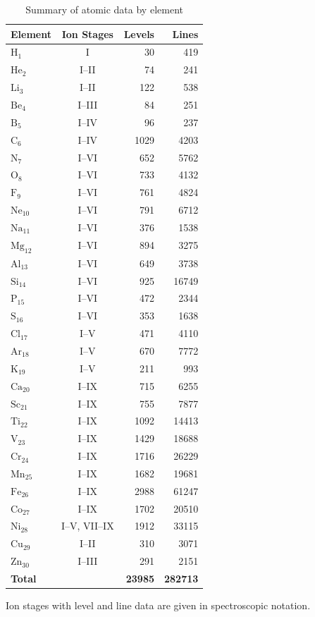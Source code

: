 \documentclass{article}
\begin{document}
\begin{table}[p]
\centering
\caption{Summary of atomic data by element\label{tab:atomdata-summary}}
\small
\renewcommand{\arraystretch}{1.12}
\begin{tabular*}{0.9\textwidth}{@{\extracolsep{\fill}}lcrr}
\hline
\textbf{Element} & \textbf{Ion Stages} & \textbf{Levels} & \textbf{Lines} \\
\hline
$\mathrm{H}_{1}$ & I & 30 & 419 \\
$\mathrm{He}_{2}$ & I--II & 74 & 241 \\
$\mathrm{Li}_{3}$ & I--II & 122 & 538 \\
$\mathrm{Be}_{4}$ & I--III & 84 & 251 \\
$\mathrm{B}_{5}$ & I--IV & 96 & 237 \\
$\mathrm{C}_{6}$ & I--IV & 1029 & 4203 \\
$\mathrm{N}_{7}$ & I--VI & 652 & 5762 \\
$\mathrm{O}_{8}$ & I--VI & 733 & 4132 \\
$\mathrm{F}_{9}$ & I--VI & 761 & 4824 \\
$\mathrm{Ne}_{10}$ & I--VI & 791 & 6712 \\
$\mathrm{Na}_{11}$ & I--VI & 376 & 1538 \\
$\mathrm{Mg}_{12}$ & I--VI & 894 & 3275 \\
$\mathrm{Al}_{13}$ & I--VI & 649 & 3738 \\
$\mathrm{Si}_{14}$ & I--VI & 925 & 16749 \\
$\mathrm{P}_{15}$ & I--VI & 472 & 2344 \\
$\mathrm{S}_{16}$ & I--VI & 353 & 1638 \\
$\mathrm{Cl}_{17}$ & I--V & 471 & 4110 \\
$\mathrm{Ar}_{18}$ & I--V & 670 & 7772 \\
$\mathrm{K}_{19}$ & I--V & 211 & 993 \\
$\mathrm{Ca}_{20}$ & I--IX & 715 & 6255 \\
$\mathrm{Sc}_{21}$ & I--IX & 755 & 7877 \\
$\mathrm{Ti}_{22}$ & I--IX & 1092 & 14413 \\
$\mathrm{V}_{23}$ & I--IX & 1429 & 18688 \\
$\mathrm{Cr}_{24}$ & I--IX & 1716 & 26229 \\
$\mathrm{Mn}_{25}$ & I--IX & 1682 & 19681 \\
$\mathrm{Fe}_{26}$ & I--IX & 2988 & 61247 \\
$\mathrm{Co}_{27}$ & I--IX & 1702 & 20510 \\
$\mathrm{Ni}_{28}$ & I--V, VII--IX & 1912 & 33115 \\
$\mathrm{Cu}_{29}$ & I--II & 310 & 3071 \\
$\mathrm{Zn}_{30}$ & I--III & 291 & 2151 \\
\textbf{Total} &  & \textbf{23985} & \textbf{282713} \\
\hline
\end{tabular*}

\medskip
\parbox{0.9\textwidth}{\footnotesize Ion stages with level and line data are given in spectroscopic notation.}
\end{table}
\end{document}

